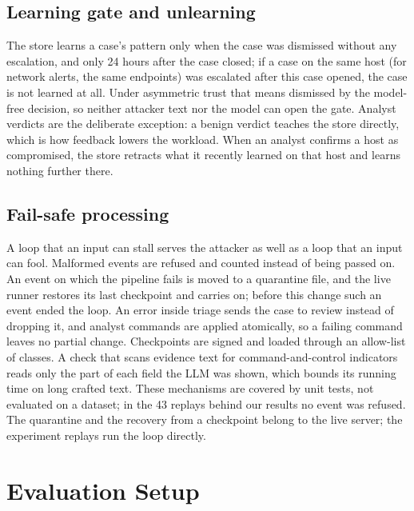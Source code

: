 \documentclass[conference]{IEEEtran}
\begin{document}
\subsection{Learning gate and unlearning}
The store learns a case's pattern only when the case was dismissed without any escalation, and only 24 hours after
the case closed; if a case on the same host (for network alerts, the same endpoints) was escalated after this case
opened, the case is not learned at all. Under asymmetric trust
that means dismissed by the model-free decision, so neither attacker text nor the model can open the gate. Analyst
verdicts are the deliberate exception: a benign verdict teaches the store directly, which is how feedback lowers
the workload. When an analyst confirms a host as compromised, the store retracts what it recently learned on that
host and learns nothing further there.

\subsection{Fail-safe processing}
A loop that an input can stall serves the attacker as well as a loop that an input can fool. Malformed events are
refused and counted instead of being passed on. An event on which the pipeline fails is moved to a quarantine file,
and the live runner restores its last checkpoint and carries on; before this change such an event ended the loop.
An error inside triage sends the case to review instead of dropping it, and analyst commands are applied
atomically, so a failing command leaves no partial change. Checkpoints are signed and loaded through an allow-list
of classes. A check that scans evidence text for command-and-control indicators reads only the part of each field
the LLM was shown, which bounds its running time on long crafted text. These mechanisms are covered by unit tests,
not evaluated on a dataset; in the 43 replays behind our results no event was refused. The quarantine and the
recovery from a checkpoint belong to the live server; the experiment replays run the loop directly.

\section{Evaluation Setup}\label{sec:setup}
\end{document}
